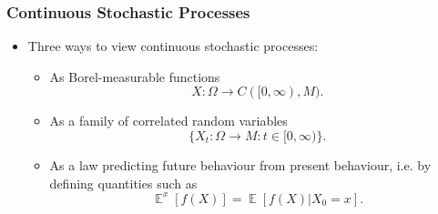 \documentclass[usenames,dvipsnames,12pt]{beamer}
\DeclareMathOperator{\EE}{\mathbb{E}}
\begin{document}
\begin{frame}
    \frametitle{Continuous Stochastic Processes}

    \begin{itemize}
        \item Three ways to view continuous stochastic processes:

        \begin{itemize}
            \pause
            \item As Borel-measurable functions
            \[ X: \Omega \to C([0,\infty), M). \]

            \pause
            \item As a family of correlated random variables
            \[ \{ X_t: \Omega \to M : t \in [0,\infty) \}. \]

            \pause
            \item As a law predicting future behaviour from present behaviour, i.e. by defining quantities such as
            \[ \EE^x[f(X)] = \EE[f(X) | X_0 = x]. \]
        \end{itemize}
    \end{itemize}
\end{frame}
\end{document}
